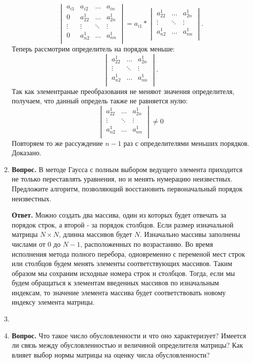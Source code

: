\documentclass[12pt, a4paper]{article}
\begin{document}
\begin{enumerate}
	$$
	\begin{vmatrix}
		a_{i1} & a_{i2} & \ldots & a_{in} \\
		0 & a_{22}^{1} & \ldots & a_{2n}^{1}\\
		\vdots & \vdots & \ddots & \vdots\\
		0 & a_{n2}^{1} & \ldots & a_{nn}^{1}\\
	\end{vmatrix} = a_{i1} * 
	\begin{vmatrix}
		a_{22}^{1} & \ldots & a_{2n}^{1}\\
		\vdots & \ddots & \vdots\\
		a_{n2}^{1} & \ldots & a_{nn}^{1}\\
	\end{vmatrix}.
	$$
	Теперь рассмотрим определитель на порядок меньше:
	$$
	\begin{vmatrix}
		a_{22}^{1} & \ldots & a_{2n}^{1}\\
		\vdots & \ddots & \vdots\\
		a_{n2}^{1} & \ldots & a_{nn}^{1}\\
	\end{vmatrix}.
	$$
	Так как элементраные преобразования не меняют значения определителя, получаем, что данный определь также не равняется нулю:
	$$
	\begin{vmatrix}
		a_{22}^{1} & \ldots & a_{2n}^{1}\\
		\vdots & \ddots & \vdots\\
		a_{n2}^{1} & \ldots & a_{nn}^{1}\\
	\end{vmatrix} \ne 0
	$$
	Повторяем то же рассуждение $n - 1$ раз с определителями меньших порядков. Доказано.
	
	\item \textbf{Вопрос.} В методе Гаусса с полным выбором ведущего элемента
	приходится не только переставлять уравнения, но и менять нумерацию неизвестных. Предложите алгоритм, позволяющий восстановить первоначальный порядок неизвестных.
	
	\textbf{Ответ.} Можно создать два массива, один из которых будет отвечать за порядок строк, а второй - за порядок столбцов. Если размер изначальной матрицы $N \times N$, длинна массивов будет $N$. Изначально массивы заполнены числами от 0 до $N - 1$, расположенных по возрастанию. Во время исполнения метода полного перебора, одновременно с переменой мест строк или столбцов будем менять элементы соответствующих массивов. Таким образом мы сохраним исходные номера строк и столбцов. Тогда, если мы будем обращаться к элементам введенных массивов по изначальным индексам, то значение элемента массива будет соответствовать новому индексу элемента матрицы.
	\item
	\item \textbf{Вопрос.} Что такое число обусловленности и что оно характеризует? Имеется ли связь между обусловленностью и величиной определителя матрицы? Как влияет выбор нормы матрицы на оценку числа обусловленности?
	

\end{enumerate}
\end{document}
